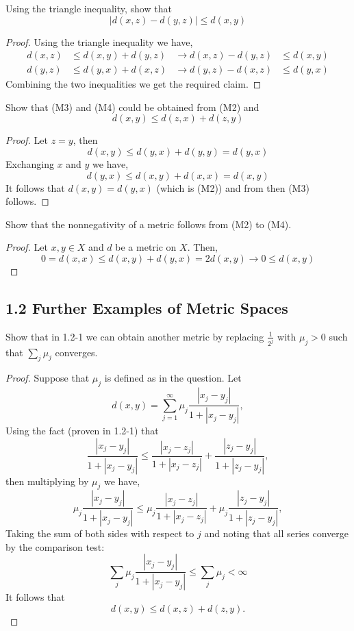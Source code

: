 \documentclass[12pt]{article}
\newcommand{\Sum}{\sum\limits}
\newenvironment{exercise}[2][Exercise]{\begin{trivlist}
\item[\hskip \labelsep {\bfseries #1}\hskip \labelsep {\bfseries #2.}]}{\end{trivlist}}
\begin{document}
\begin{exercise}{1.1.13}
    Using the triangle inequality, show that
    \[ |d(x, z) - d(y, z)| \leq d(x, y) \]
\end{exercise}
\begin{proof}
    Using the triangle inequality we have,
    \begin{align*}
        d(x, z) & \leq d(x, y) + d(y, z) &\longrightarrow d(x, z) - d(y, z) &\leq d(x, y) \\
        d(y, z) & \leq d(y, x) + d(x, z) &\longrightarrow d(y, z) - d(x, z) &\leq d(y, x)
    \end{align*}
    Combining the two inequalities we get the required claim.
\end{proof}

\begin{exercise}{1.1.14}
    Show that (M3) and (M4) could be obtained from (M2) and
    \[ d(x, y) \leq d(z, x) + d(z, y) \]
\end{exercise}
\begin{proof}
    Let $z=y$, then
    \[ d(x, y) \leq d(y, x) + d(y, y) = d(y, x) \]
    Exchanging $x$ and $y$ we have,
    \[ d(y, x) \leq d(x, y) + d(x, x) = d(x, y) \]
    It follows that $d(x, y) = d(y, x)$ (which is (M2)) and from then (M3) follows.
\end{proof}

\begin{exercise}{1.1.15}
    Show that the nonnegativity of a metric follows from (M2) to (M4).
\end{exercise}
\begin{proof}
    Let $x, y \in X$ and $d$ be a metric on $X$. Then,
    \[ 0 = d(x, x) \leq d(x, y) + d(y, x) = 2 d(x, y) \rightarrow 0 \leq d(x, y) \]
\end{proof}


\subsection*{1.2 Further Examples of Metric Spaces}
\begin{exercise}{1.2.1}
    Show that in 1.2-1 we can obtain another metric by replacing $\frac{1}{2^{j}}$ with $\mu_{j} > 0$ such that $\sum_{j} \mu_j$ converges.
\end{exercise}
\begin{proof}
    Suppose that $\mu_j$ is defined as in the question. Let
    \[ d(x, y) = \Sum_{j=1}^{\infty} \mu_j \frac{ |x_j - y_j| }{1 + |x_j - y_j| },  \]
    Using the fact (proven in 1.2-1) that
    \[ \frac{|x_j - y_j|}{1 + |x_j - y_j|} \leq \frac{|x_j - z_j|}{1 + |x_j - z_j|}  + \frac{|z_j - y_j|}{1 + |z_j - y_j|},   \]
    then multiplying by $\mu_j$ we have,
    \[ \mu_j \frac{|x_j - y_j|}{1 + |x_j - y_j|} \leq \mu_j \frac{|x_j - z_j|}{1 + |x_j - z_j|}  + \mu_j \frac{|z_j - y_j|}{1 + |z_j - y_j|},  \]
    Taking the sum of both sides with respect to $j$ and noting that all series converge by the comparison test:
    \[ \sum_{j} \mu_j \frac{|x_j - y_j|}{1 + |x_j - y_j|} \leq \sum_{j} \mu_j < \infty  \]
    It follows that
    \[ d(x, y) \leq d(x, z) + d(z, y). \]
\end{proof}
\end{document}
